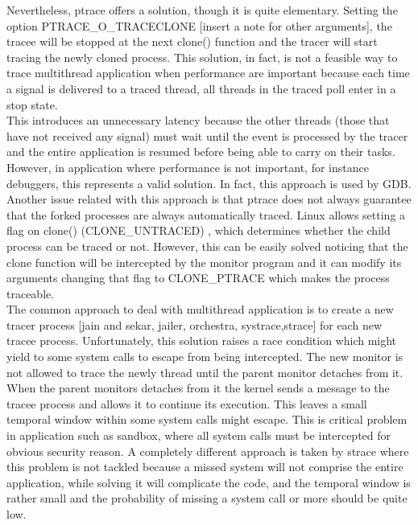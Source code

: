 Nevertheless, ptrace offers a solution, though it is quite elementary. Setting the option PTRACE\_O\_TRACECLONE [insert a note for other arguments], the tracee will be stopped at the next clone() function and the tracer will start tracing the newly cloned process.  This solution, in fact, is not a feasible way to trace multithread application when performance are important because each time a signal is delivered to a traced thread, all threads in the traced poll enter in a stop state. \\
This introduces an unnecessary latency because the other threads (those that have not received any signal) must wait until the event is processed by the tracer and the entire application is resumed before being able to carry on their tasks. However, in application where performance is not important, for instance debuggers, this represents a valid solution. In fact, this approach is used by GDB.  Another issue related with this approach is that ptrace does not always guarantee that the forked processes are always automatically traced.  Linux allows setting a flag on clone() (CLONE\_UNTRACED)  , which determines whether the child process can be traced or not. However, this can be easily solved noticing that the clone function will be intercepted by the monitor program and it can modify its arguments changing that flag to CLONE\_PTRACE which makes the process traceable.\\ 
The common approach to deal with multithread application is to create a new tracer process [jain and sekar, jailer, orchestra, systrace,strace] for each new tracee process. Unfortunately, this solution raises a race condition which might yield to some system calls to escape from being intercepted. The new monitor is not allowed to trace the newly thread until the parent monitor detaches from it.  When the parent monitors detaches from it the kernel sends a message to the tracee process and allows it to continue its execution.  This leaves a small temporal window within some system calls might escape.  This is critical problem in application such as sandbox, where all system calls must be intercepted for obvious security reason. A completely different approach is taken by strace where this problem is not tackled because a missed system will not comprise the entire application, while solving it will complicate the code, and the temporal window is rather small and the probability of missing a system call or more should be quite low.\\

